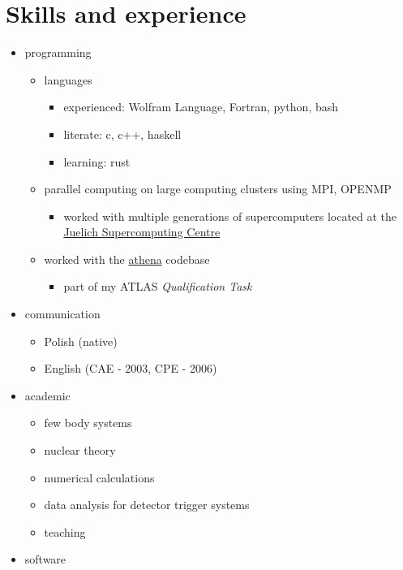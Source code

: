 \documentclass{article}
\providecommand{\tightlist}{%
  \setlength{\itemsep}{0pt}\setlength{\parskip}{0pt}}
\begin{document}
\hypertarget{skills-and-experience}{%
\section{Skills and experience}\label{skills-and-experience}}

\begin{itemize}
\tightlist
\item
  programming

  \begin{itemize}
  \tightlist
  \item
    languages

    \begin{itemize}
    \tightlist
    \item
      experienced: Wolfram Language, Fortran, python, bash
    \item
      literate: c, c++, haskell
    \item
      learning: rust
    \end{itemize}
  \item
    parallel computing on large computing clusters using MPI, OPENMP

    \begin{itemize}
    \tightlist
    \item
      worked with multiple generations of supercomputers located at the
      \href{https://www.fz-juelich.de/en/ias/jsc/systems/supercomputers}{Juelich
      Supercomputing Centre}
    \end{itemize}
  \item
    worked with the \href{https://gitlab.cern.ch/atlas/athena}{athena}
    codebase

    \begin{itemize}
    \tightlist
    \item
      part of my ATLAS \emph{Qualification Task}
    \end{itemize}
  \end{itemize}
\item
  communication

  \begin{itemize}
  \tightlist
  \item
    Polish (native)
  \item
    English (CAE - 2003, CPE - 2006)
  \end{itemize}
\item
  academic

  \begin{itemize}
  \tightlist
  \item
    few body systems
  \item
    nuclear theory
  \item
    numerical calculations
  \item
    data analysis for detector trigger systems
  \item
    teaching
  \end{itemize}
\item
  software


\end{itemize}
\end{document}
